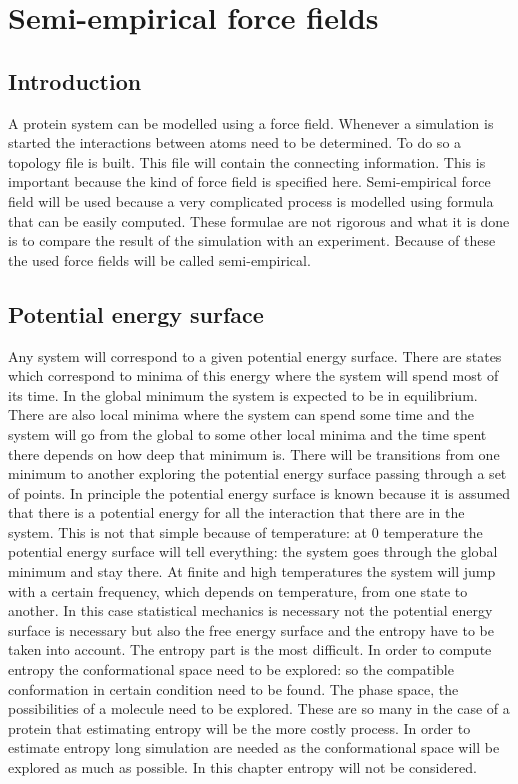 \chapter{Semi-empirical force fields}

\section{Introduction}
A protein system can be modelled using a force field.
Whenever a simulation is started the interactions between atoms need to be determined.
To do so a topology file is built.
This file will contain the connecting information.
This is important because the kind of force field is specified here.
Semi-empirical force field will be used because a very complicated process is modelled using formula that can be easily computed.
These formulae are not rigorous and what it is done is to compare the result of the simulation with an experiment.
Because of these the used force fields will be called semi-empirical.

\section{Potential energy surface}
Any system will correspond to a given potential energy surface.
There are states which correspond to minima of this energy where the system will spend most of its time.
In the global minimum the system is expected to be in equilibrium.
There are also local minima where the system can spend some time and the system will go from the global to some other local minima and the time spent there depends on how deep that minimum is.
There will be transitions from one minimum to another exploring the potential energy surface passing through a set of points.
In principle the potential energy surface is known because it is assumed that there is a potential energy for all the interaction that there are in the system.
This is not that simple because of temperature: at $0$ temperature the potential energy surface will tell everything: the system goes through the global minimum and stay there.
At finite and high temperatures the system will jump with a certain frequency, which depends on temperature, from one state to another.
In this case statistical mechanics is necessary not the potential energy surface is necessary but also the free energy surface and the entropy have to be taken into account.
The entropy part is the most difficult.
In order to compute entropy the conformational space need to be explored: so the compatible conformation in certain condition need to be found.
The phase space, the possibilities of a molecule need to be explored.
These are so many in the case of a protein that estimating entropy will be the more costly process.
In order to estimate entropy long simulation are needed as the conformational space will be explored as much as possible.
In this chapter entropy will not be considered.

